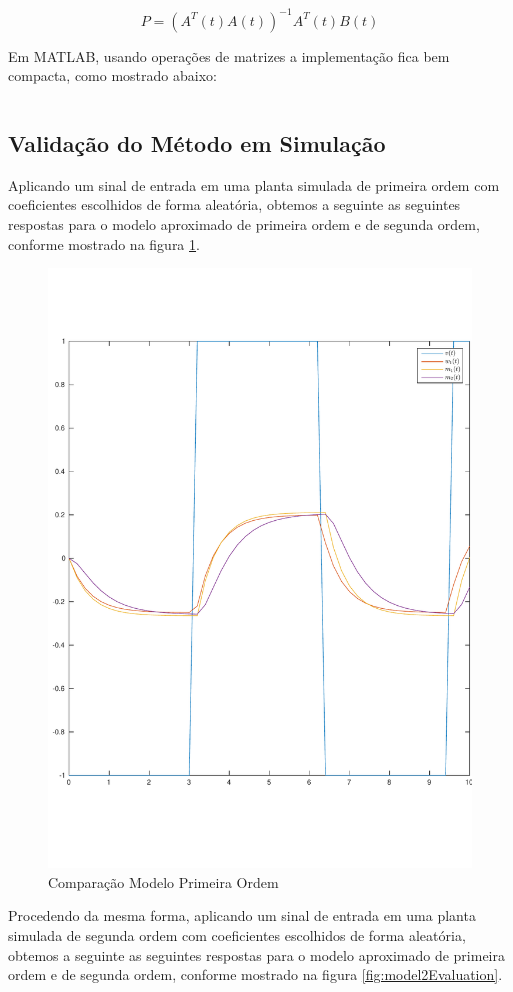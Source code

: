 \documentclass[a4paper,11pt]{article}
\begin{document}
\begin{equation}
    P = \left(A^T(t) A(t)\right)^{-1} A^T(t) B(t)
\end{equation}

Em MATLAB, usando operações de matrizes a implementação fica bem compacta, como mostrado abaixo:

\inputminted[frame=single,framesep=10pt]{matlab}{../src/matlab/secondordertf.m}

\subsection{Validação do Método em Simulação}

Aplicando um sinal de entrada em uma planta simulada de primeira ordem com coeficientes escolhidos de forma aleatória, obtemos a seguinte as seguintes respostas para o modelo aproximado de primeira ordem e de segunda ordem, conforme mostrado na figura \ref{fig:model1Evaluation}.

\begin{figure}[H]
    \centering
    \includegraphics[width=0.6\linewidth]{tex/img/model1Evaluation.pdf}
    \caption{Comparação Modelo Primeira Ordem}
    \label{fig:model1Evaluation}
\end{figure}

Procedendo da mesma forma, aplicando um sinal de entrada em uma planta simulada de segunda ordem com coeficientes escolhidos de forma aleatória, obtemos a seguinte as seguintes respostas para o modelo aproximado de primeira ordem e de segunda ordem, conforme mostrado na figura \ref{fig:model2Evaluation}.
\end{document}
